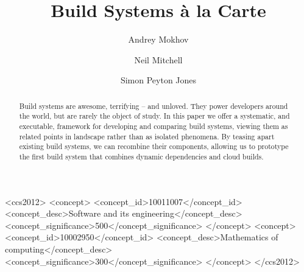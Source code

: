 \documentclass[acmsmall]{acmart}\settopmatter{}
\begin{document}
\title[Build Systems \`a la Carte]{Build Systems \`a la Carte}

\author{Andrey Mokhov}

\author{Neil Mitchell}

\author{Simon Peyton Jones}

\begin{abstract}
Build systems are awesome, terrifying -- and unloved.
They power developers around the world, but are rarely the object of study.
In this paper we offer a systematic, and executable, framework for developing and comparing
build systems, viewing them as related points in landscape rather than as isolated phenomena.
By teasing apart existing build systems, we can recombine their components,
allowing us to prototype the first build
system that combines dynamic dependencies and cloud builds.
\end{abstract}

\begin{CCSXML}
<ccs2012>
<concept>
<concept_id>10011007</concept_id>
 <concept_desc>Software and its engineering</concept_desc>
<concept_significance>500</concept_significance>
</concept>
<concept>
<concept_id>10002950</concept_id>
 <concept_desc>Mathematics of computing</concept_desc>
<concept_significance>300</concept_significance>
</concept>
</ccs2012>
\end{CCSXML}

\maketitle
\end{document}
